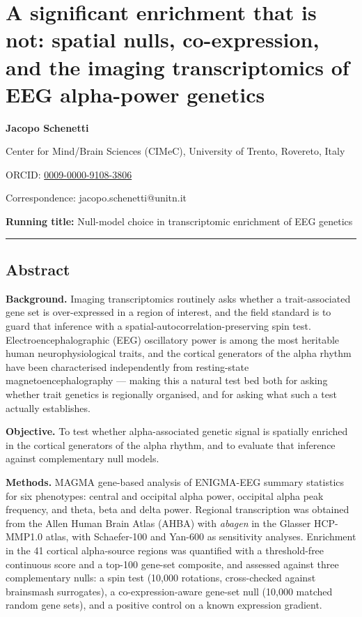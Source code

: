 \documentclass[
  11pt,
  letterpaper,
]{article}
\author{}
\date{}
\begin{document}
\section{A significant enrichment that is not: spatial nulls,
co-expression, and the imaging transcriptomics of EEG alpha-power
genetics}\label{a-significant-enrichment-that-is-not-spatial-nulls-co-expression-and-the-imaging-transcriptomics-of-eeg-alpha-power-genetics}

\textbf{Jacopo Schenetti}

Center for Mind/Brain Sciences (CIMeC), University of Trento, Rovereto,
Italy

ORCID: \href{https://orcid.org/0009-0000-9108-3806}{0009-0000-9108-3806}

Correspondence: jacopo.schenetti@unitn.it

\textbf{Running title:} Null-model choice in transcriptomic enrichment
of EEG genetics

\begin{center}\rule{0.5\linewidth}{0.5pt}\end{center}

\subsection{Abstract}\label{abstract}

\textbf{Background.} Imaging transcriptomics routinely asks whether a
trait-associated gene set is over-expressed in a region of interest, and
the field standard is to guard that inference with a
spatial-autocorrelation-preserving spin test. Electroencephalographic
(EEG) oscillatory power is among the most heritable human
neurophysiological traits, and the cortical generators of the alpha
rhythm have been characterised independently from resting-state
magnetoencephalography --- making this a natural test bed both for
asking whether trait genetics is regionally organised, and for asking
what such a test actually establishes.

\textbf{Objective.} To test whether alpha-associated genetic signal is
spatially enriched in the cortical generators of the alpha rhythm, and
to evaluate that inference against complementary null models.

\textbf{Methods.} MAGMA gene-based analysis of ENIGMA-EEG summary
statistics for six phenotypes: central and occipital alpha power,
occipital alpha peak frequency, and theta, beta and delta power.
Regional transcription was obtained from the Allen Human Brain Atlas
(AHBA) with \emph{abagen} in the Glasser HCP-MMP1.0 atlas, with
Schaefer-100 and Yan-600 as sensitivity analyses. Enrichment in the 41
cortical alpha-source regions was quantified with a threshold-free
continuous score and a top-100 gene-set composite, and assessed against
three complementary nulls: a spin test (10,000 rotations, cross-checked
against brainsmash surrogates), a co-expression-aware gene-set null
(10,000 matched random gene sets), and a positive control on a known
expression gradient.
\end{document}

